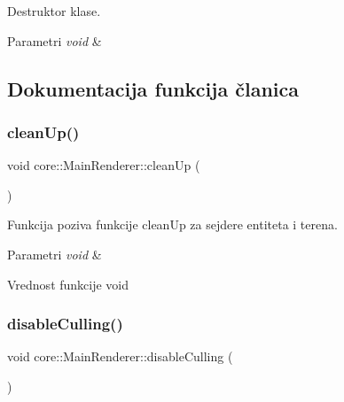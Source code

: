 Destruktor klase. 


\begin{DoxyParams}{Parametri}
{\em void} & \\
\hline
\end{DoxyParams}


\subsection{Dokumentacija funkcija članica}
\mbox{\label{classcore_1_1MainRenderer_af55caf59bc4f10718a18ecb3e784b778}} 
\subsubsection{\texorpdfstring{clean\+Up()}{cleanUp()}}
{\footnotesize\ttfamily void core\+::\+Main\+Renderer\+::clean\+Up (\begin{DoxyParamCaption}\item[{void}]{ }\end{DoxyParamCaption})}



Funkcija poziva funkcije clean\+Up za sejdere entiteta i terena. 


\begin{DoxyParams}{Parametri}
{\em void} & \\
\hline
\end{DoxyParams}
\begin{DoxyReturn}{Vrednost funkcije}
void 
\end{DoxyReturn}
\mbox{\label{classcore_1_1MainRenderer_a00a3d49faabb02f0984f521208681ac4}} 
\subsubsection{\texorpdfstring{disable\+Culling()}{disableCulling()}}
{\footnotesize\ttfamily void core\+::\+Main\+Renderer\+::disable\+Culling (\begin{DoxyParamCaption}{ }\end{DoxyParamCaption})}



